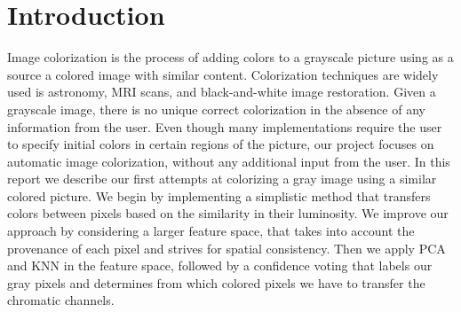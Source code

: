 \section{Introduction}
\label{sec:intro}

Image colorization is the process of adding colors to a grayscale picture using as a source a colored image with similar content. Colorization techniques are widely used is astronomy, MRI scans, and  black-and-white image restoration. Given a grayscale image, there is no unique correct colorization in the absence of any information from the user. Even though many implementations require the user to specify initial colors in certain regions of the picture, our project focuses on automatic image colorization, without any additional input from the user. 
In this report we describe our first attempts at colorizing a gray image using a similar colored picture. We begin by implementing a simplistic method that transfers colors between pixels based on the similarity in their luminosity. We improve our approach by considering a larger feature space, that takes into account the provenance of each pixel and strives for spatial consistency. Then we apply PCA and KNN in the feature space, followed by a confidence voting that labels our gray pixels and determines from which colored pixels we have to transfer the chromatic channels.



